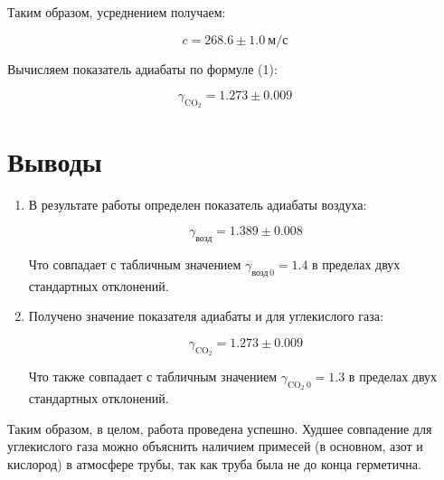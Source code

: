 \documentclass[12pt,a4paper]{scrartcl}
\begin{document}
	Таким образом, усреднением получаем:
	
	$$c = 268.6 \pm 1.0\ \text{м}/\text{с}$$
	
	Вычисляем показатель адиабаты по формуле (1):
	
	$$\gamma_{\mathrm{CO}_2} = 1.273 \pm 0.009$$		
		
	\section{Выводы}
	\begin{enumerate}
		\item В результате работы определен показатель адиабаты воздуха:
		
		$$\gamma_{\text{возд}} = 1.389 \pm 0.008$$
		
		Что совпадает с табличным значением $\gamma_{\text{возд}\, 0} = 1.4$ в пределах двух стандартных отклонений.
		
		\item Получено значение показателя адиабаты и для углекислого газа:
		
		$$\gamma_{\mathrm{CO}_2} = 1.273 \pm 0.009$$		
		
		Что также совпадает с табличным значением $\gamma_{\mathrm{CO}_2\ 0} = 1.3$ в пределах двух стандартных отклонений.
	\end{enumerate}
	
	
	Таким образом, в целом, работа проведена успешно. Худшее совпадение для углекислого газа можно объяснить наличием примесей (в основном, азот и кислород) в атмосфере трубы, так как труба была не до конца герметична.
		
\end{document}
